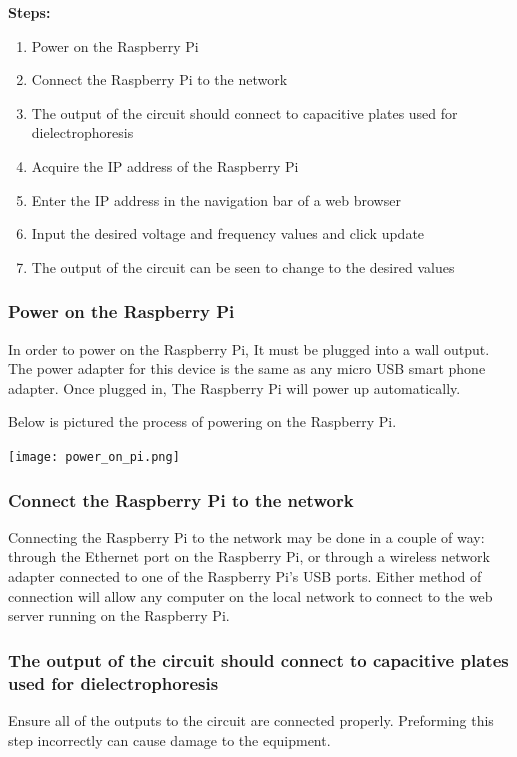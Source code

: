\documentclass{article}	%
\begin{document}
\begin{multicols}{2}
\textbf{Steps:}
\begin{enumerate}
\item{Power on the Raspberry Pi}
\item{Connect the Raspberry Pi to the network}
\item{The output of the circuit should connect to capacitive plates used for dielectrophoresis}
\item{Acquire the IP address of the Raspberry Pi}
\item{Enter the IP address in the navigation bar of a web browser}
\item{Input the desired voltage and frequency values and click update}
\item{The output of the circuit can be seen to change to the desired values}
\end{enumerate}

\subsubsection{Power on the Raspberry Pi}
In order to power on the Raspberry Pi,
It must be plugged into a wall output.
The power adapter for this device is
the same as any micro USB smart phone adapter.
Once plugged in,
The Raspberry Pi will power up automatically.

Below is pictured the process of
powering on the Raspberry Pi.
\begin{center}
\texttt{[image: power\_on\_pi.png]}
\end{center}

\subsubsection{Connect the Raspberry Pi to the network}
Connecting the Raspberry Pi to the network may
be done in a couple of way:
through the Ethernet port on the Raspberry Pi, or
through a wireless network adapter connected to
one of the Raspberry Pi's USB ports.
Either method of connection will allow
any computer on the local network to 
connect to the web server running on the Raspberry Pi.

\subsubsection{The output of the circuit should connect to capacitive plates used for dielectrophoresis}
Ensure all of the outputs to the circuit are connected properly.
Preforming this step incorrectly can cause damage to the equipment.


\end{multicols}
\end{document}
